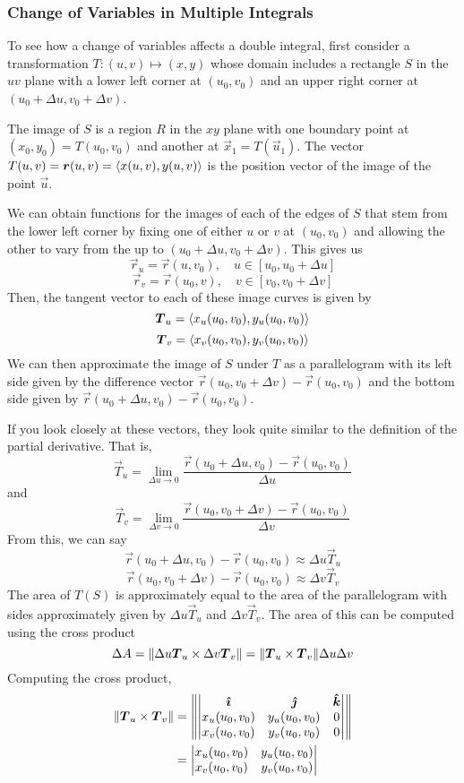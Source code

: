 \subsubsection{Change of Variables in Multiple Integrals}
To see how a change of variables affects a double integral, first consider a transformation $T: (u,v) \mapsto (x,y)$ whose domain includes a rectangle $S$ in the $uv$ plane with a lower left corner at $(u_0, v_0)$ and an upper right corner at $(u_0 + \Delta u, v_0 + \Delta v)$. \par
The image of $S$ is a region $R$ in the $xy$ plane with one boundary point at $(x_0, y_0) = T(u_0, v_0)$ and another at $\vec x_1 = T(\vec u_1)$. The vector $T(u, v) = \boldsymbol{r}(u, v) = \left\langle x(u, v), y(u,v)\right\rangle$ is the position vector of the image of the point $\vec u$. \par
We can obtain functions for the images of each of the edges of $S$ that stem from the lower left corner by fixing one of either $u$ or $v$ at $(u_0, v_0)$ and allowing the other to vary from the up to $(u_0+\Delta u, v_0 + \Delta v)$. This gives us
\[ \vec r_u = \vec r (u, v_0), \quad u\in[u_0, u_0+\Delta u] \]
\[ \vec r_v = \vec r (u_0, v), \quad v\in[v_0, v_0+\Delta v] \]
Then, the tangent vector to each of these image curves is given by
\[ \boldsymbol{T}_u = \left\langle x_u(u_0, v_0), y_u(u_0, v_0)\right\rangle \]
\[ \boldsymbol{T}_v = \left\langle x_v(u_0, v_0), y_v(u_0, v_0)\right\rangle \]
We can then approximate the image of $S$ under $T$ as a parallelogram with its left side given by the difference vector $\vec r(u_0, v_0 + \Delta v) - \vec r(u_0, v_0)$ and the bottom side given by $\vec r(u_0 + \Delta u, v_0) - \vec r(u_0, v_0)$. \par
If you look closely at these vectors, they look quite similar to the definition of the partial derivative. That is,
\[ \vec T_u = \lim_{\Delta u\to 0}\frac{\vec r(u_0 + \Delta u, v_0) - \vec r(u_0, v_0)}{\Delta u} \]
and 
\[ \vec T_v = \lim_{\Delta v\to 0}\frac{\vec r(u_0, v_0 + \Delta v) - \vec r(u_0, v_0)}{\Delta v} \]
From this, we can say
\[ \vec r(u_0 + \Delta u, v_0) - \vec r(u_0, v_0) \approx \Delta u \vec T_u \]
\[ \vec r(u_0, v_0 + \Delta v) - \vec r(u_0, v_0) \approx \Delta v\vec T_v \]
The area of $T(S)$ is approximately equal to the area of the parallelogram with sides approximately given by $\Delta u \vec T_u$ and $\Delta v \vec T_v$. The area of this can be computed using the cross product
\[ \Delta A = \norm{\Delta u \boldsymbol{T}_u \times \Delta v \boldsymbol{T}_v} = \norm{\boldsymbol{T}_u \times \boldsymbol{T}_v}\Delta u\Delta v\]
Computing the cross product,
\begin{align*}
    \norm{\boldsymbol{T}_u \times \boldsymbol{T}_v} &= \norm{\begin{vmatrix}
        \boldsymbol{\hat{\imath}} & \boldsymbol{\hat{\jmath}} & \boldsymbol{\hat{k}} \\
        x_u(u_0, v_0) & y_u(u_0, v_0) & 0 \\
        x_v(u_0, v_0) & y_v(u_0, v_0) & 0
    \end{vmatrix}} \\
    &= \begin{vmatrix}
        x_u(u_0, v_0) & y_u(u_0, v_0) \\
        x_v(u_0, v_0) & y_v(u_0, v_0)
    \end{vmatrix} \\
\end{align*}
